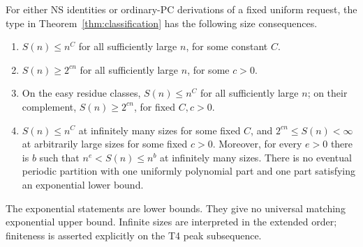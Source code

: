 \begin{corollary}\label{cor:dense-types}
For either NS identities or ordinary-PC derivations of a fixed uniform
request, the type in Theorem~\ref{thm:classification} has the following
size consequences.
\begin{enumerate}[label=\textup{T\arabic*.}]
\item $S(n)\le n^C$ for all sufficiently large $n$, for some constant $C$.
\item $S(n)\ge2^{cn}$ for all sufficiently large $n$, for some $c>0$.
\item On the easy residue classes, $S(n)\le n^C$ for all sufficiently
large $n$; on their complement, $S(n)\ge2^{cn}$, for fixed $C,c>0$.
\item $S(n)\le n^C$ at infinitely many sizes for some fixed $C$, and
$2^{cn}\le S(n)<\infty$ at arbitrarily large sizes for some fixed $c>0$.
Moreover, for every $e>0$ there is $b$ such that
$n^e<S(n)\le n^b$ at infinitely many sizes. There is no eventual periodic
partition with one uniformly polynomial part and one part satisfying an
exponential lower bound.
\end{enumerate}
The exponential statements are lower bounds. They give no universal
matching exponential upper bound. Infinite sizes are interpreted in the
extended order; finiteness is asserted explicitly on the T4 peak
subsequence.
\end{corollary}

